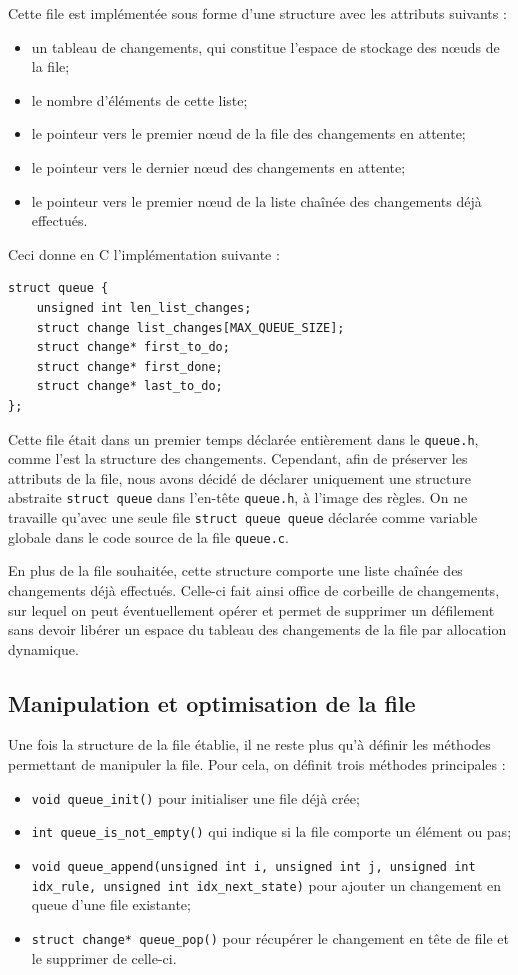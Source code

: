 Cette file est implémentée sous forme d'une structure avec les attributs suivants :
\begin{itemize}
    \item un tableau de changements, qui constitue l'espace de stockage des nœuds de la file;
    \item le nombre d'éléments de cette liste;
    \item le pointeur vers le premier nœud de la file des changements en attente;
    \item le pointeur vers le dernier nœud des changements en attente;
    \item le pointeur vers le premier nœud de la liste chaînée des changements déjà effectués.
\end{itemize}

Ceci donne en C l'implémentation suivante :
\begin{lstlisting}
struct queue {
    unsigned int len_list_changes;
    struct change list_changes[MAX_QUEUE_SIZE];
    struct change* first_to_do;
    struct change* first_done;
    struct change* last_to_do;
};
\end{lstlisting}
\label{lst:StructureQueue}
\clearpage
Cette file était dans un premier temps déclarée entièrement dans le \texttt{queue.h}, comme l'est la structure des changements. Cependant, afin de préserver les attributs de la file, nous avons décidé de déclarer uniquement une structure abstraite \lstinline{struct queue} dans l'en-tête \texttt{queue.h}, à l'image des règles. On ne travaille qu'avec une seule file \lstinline{struct queue queue} déclarée comme variable globale dans le code source de la file \texttt{queue.c}.

En plus de la file souhaitée, cette structure comporte une liste chaînée des changements déjà effectués. Celle-ci fait ainsi office de \og corbeille \fg{} de changements, sur lequel on peut éventuellement opérer et permet de \og  supprimer \fg{} un défilement sans devoir libérer un espace du tableau des changements de la file par allocation dynamique.

\subsection{Manipulation et optimisation de la file}
Une fois la structure de la file établie, il ne reste plus qu'à définir les méthodes permettant de manipuler la file.
Pour cela, on définit trois méthodes principales :
\begin{itemize}
    \item \lstinline{void queue_init()} pour initialiser une file déjà crée;
    \item \lstinline{int queue_is_not_empty()} qui indique si la file comporte un élément ou pas;
    \item \lstinline{void queue_append(unsigned int i, unsigned int j, unsigned int idx_rule, unsigned int idx_next_state)} pour ajouter un changement en queue d'une file existante;
    \item \lstinline{struct change* queue_pop()} pour récupérer le changement en tête de file et le supprimer de celle-ci.
\end{itemize}

